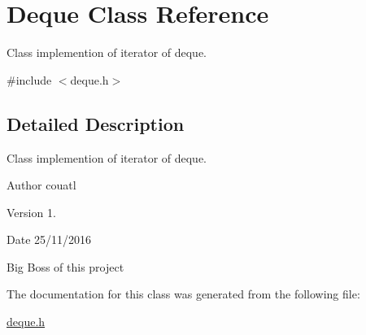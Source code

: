 \hypertarget{class_deque}{}\section{Deque Class Reference}
\label{class_deque}


Class implemention of iterator of deque.  




{\ttfamily \#include $<$deque.\+h$>$}



\subsection{Detailed Description}
Class implemention of iterator of deque. 

\begin{DoxyAuthor}{Author}
couatl 
\end{DoxyAuthor}
\begin{DoxyVersion}{Version}
1. 
\end{DoxyVersion}
\begin{DoxyDate}{Date}
25/11/2016
\end{DoxyDate}
Big Boss of this project 

The documentation for this class was generated from the following file\+:\begin{DoxyCompactItemize}
\item 
\hyperlink{deque_8h}{deque.\+h}\end{DoxyCompactItemize}
